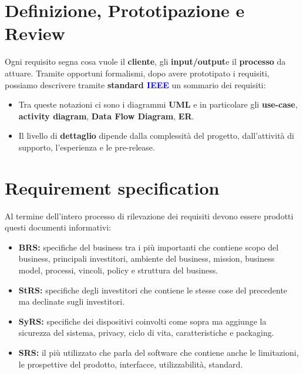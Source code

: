 \section{Definizione, Prototipazione e Review}
Ogni requisito segna cosa vuole il \textbf{cliente}, gli \textbf{input/output}e il \textbf{processo} da attuare. Tramite opportuni formalismi, dopo avere prototipato i requisiti, possiamo descrivere tramite \textbf{standard \textcolor{blue}{IEEE}} un sommario dei requisiti:
\begin{itemize}
    \item Tra queste notazioni ci sono i diagrammi \textbf{UML} e in particolare gli \textbf{use-case}, \textbf{activity diagram}, \textbf{Data Flow Diagram}, \textbf{ER}.
    \item Il livello di \textbf{dettaglio} dipende dalla complessità del progetto, dall'attività di supporto, l'esperienza e le pre-release.
\end{itemize}

\section{Requirement specification}
Al termine dell'intero processo di rilevazione dei requisiti devono essere prodotti questi documenti informativi:
\begin{itemize}
    \item \textbf{BRS:} specifiche del business tra i più importanti che contiene scopo del business, principali investitori, ambiente del business, mission, business model, processi, vincoli, policy e struttura del business.
    \item \textbf{StRS:} specifiche degli investitori che contiene le stesse cose del precedente ma declinate sugli investitori.
    \item \textbf{SyRS:} specifiche dei dispositivi coinvolti come sopra ma aggiunge la sicurezza del sistema, privacy, ciclo di vita, caratteristiche e packaging.
    \item \textbf{SRS:} il più utilizzato che parla del software che contiene anche le limitazioni, le prospettive del prodotto, interfacce, utilizzabilità, standard.
\end{itemize}

